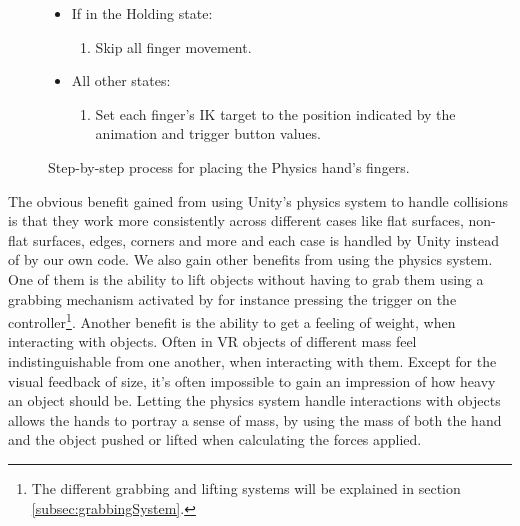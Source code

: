 \begin{figure}[H]
\begin{itemize}[noitemsep]
\begin{enumerate}[noitemsep]
\item Get the position that each finger would have according the the animation and trigger button value.
\item Find an intermediate position for the fingers slerping\footnote{SOMETHING ABOUT SLERPING HERE!} from the saved IK target position towards the animation position.
\item Set the IK target of the finger to the intermediate position found for it.
\end{enumerate}
\item If in the Holding state:
\begin{enumerate}[noitemsep]
\item Skip all finger movement.
\end{enumerate}
\item All other states:
\begin{enumerate}[noitemsep]
\item Set each finger's IK target to the position indicated by the animation and trigger button values.
\end{enumerate}
\end{itemize}
\caption{Step-by-step process for placing the Physics hand's fingers.}
\label{fig:stepByStepPhysicsHandFingers}
\end{figure}


The obvious benefit gained from using Unity's physics system to handle collisions is that they work more consistently across different cases like flat surfaces, non-flat surfaces, edges, corners and more and each case is handled by Unity instead of by our own code. We also gain other benefits from using the physics system. One of them is the ability to lift objects without having to grab them using a grabbing mechanism activated by for instance pressing the trigger on the controller\footnote{The different grabbing and lifting systems will be explained in section \ref{subsec:grabbingSystem}.}. Another benefit is the ability to get a feeling of weight, when interacting with objects. Often in VR objects of different mass feel indistinguishable from one another, when interacting with them. Except for the visual feedback of size, it's often impossible to gain an impression of how heavy an object should be. Letting the physics system handle interactions with objects allows the hands to portray a sense of mass, by using the mass of both the hand and the object pushed or lifted when calculating the forces applied.

